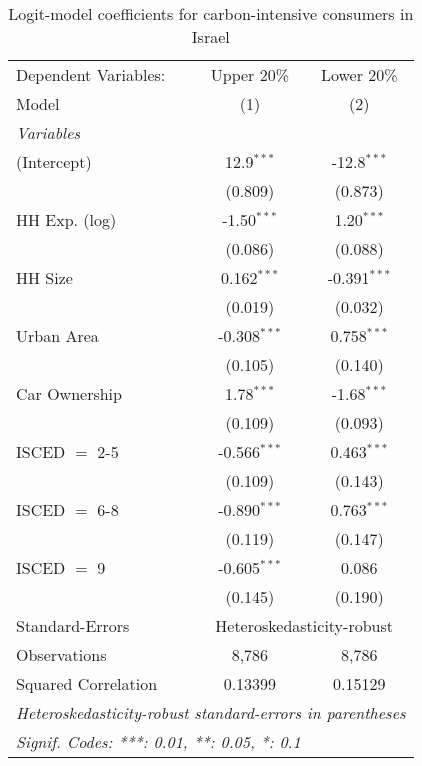 
\begin{table}[htbp!]
   \centering
   \small
   \begin{adjustbox}{width = 1\textwidth, max height = 0.95\textheight, center}
      \begin{threeparttable}[b]
         \caption{\label{tab:Logit_1_ISR} Logit-model coefficients for carbon-intensive consumers in Israel}
         \begin{tabular}{lcc}
            \tabularnewline \midrule \midrule
            Dependent Variables: & Upper 20\%     & Lower 20\%\\   
            Model                & (1)            & (2)\\  
            \midrule
            \emph{Variables}\\
            (Intercept)          & 12.9$^{***}$   & -12.8$^{***}$\\   
                                 & (0.809)        & (0.873)\\   
            HH Exp. (log)        & -1.50$^{***}$  & 1.20$^{***}$\\   
                                 & (0.086)        & (0.088)\\   
            HH Size              & 0.162$^{***}$  & -0.391$^{***}$\\   
                                 & (0.019)        & (0.032)\\   
            Urban Area           & -0.308$^{***}$ & 0.758$^{***}$\\   
                                 & (0.105)        & (0.140)\\   
            Car Ownership        & 1.78$^{***}$   & -1.68$^{***}$\\   
                                 & (0.109)        & (0.093)\\   
            ISCED $=$ 2-5        & -0.566$^{***}$ & 0.463$^{***}$\\   
                                 & (0.109)        & (0.143)\\   
            ISCED $=$ 6-8        & -0.890$^{***}$ & 0.763$^{***}$\\   
                                 & (0.119)        & (0.147)\\   
            ISCED $=$ 9          & -0.605$^{***}$ & 0.086\\   
                                 & (0.145)        & (0.190)\\   
            \midrule 
            Standard-Errors & \multicolumn{2}{c}{Heteroskedasticity-robust} \\ 
            Observations         & 8,786          & 8,786\\  
            Squared Correlation  & 0.13399        & 0.15129\\  
            \midrule \midrule
            \multicolumn{3}{l}{\emph{Heteroskedasticity-robust standard-errors in parentheses}}\\
            \multicolumn{3}{l}{\emph{Signif. Codes: ***: 0.01, **: 0.05, *: 0.1}}\\
         \end{tabular}
         

\end{threeparttable}
\end{adjustbox}
\end{table}
